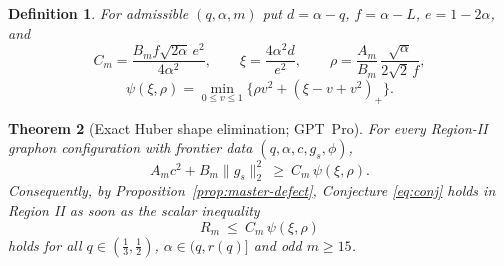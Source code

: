 \documentclass[11pt]{article}
\newtheorem{theorem}{Theorem}[section]
\newtheorem{definition}[theorem]{Definition}
\newcommand{\pos}[1]{\left(#1\right)_{+}}
\begin{document}
\begin{definition}\label{def:huber}
For admissible $(q,\alpha,m)$ put $d=\alpha-q$, $f=\alpha-L$, $e=1-2\alpha$, and
\begin{equation}\label{eq:Cxirho}
        C_m=\frac{B_mf\sqrt{2\alpha}\,e^2}{4\alpha^2},
        \qquad
        \xi=\frac{4\alpha^2d}{e^2},
        \qquad
        \rho=\frac{A_m}{B_m}\,\frac{\sqrt\alpha}{2\sqrt2\,f},
\end{equation}
\begin{equation}\label{eq:psi}
        \psi(\xi,\rho)=\min_{0\le v\le1}\bigl\{\rho v^2+\pos{\xi-v+v^2}\bigr\}.
\end{equation}
\end{definition}

\begin{theorem}[Exact Huber shape elimination; GPT~Pro]\label{thm:huber}
For every Region-II graphon configuration with frontier data
$(q,\alpha,c,g_s,\phi)$,
\[
        A_mc^2+B_m\|g_s\|_2^2\ \ge\ C_m\,\psi(\xi,\rho).
\]
Consequently, by Proposition~\ref{prop:master-defect}, Conjecture \eqref{eq:conj}
holds in Region II as soon as the scalar inequality
\begin{equation}\label{eq:scalar-target}
        R_m\ \le\ C_m\,\psi(\xi,\rho)
\end{equation}
holds for all $q\in(\tfrac13,\tfrac12)$, $\alpha\in(q,r(q)]$ and odd $m\ge15$.
\end{theorem}
\end{document}

